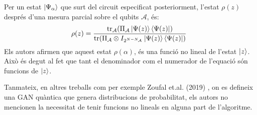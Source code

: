Per un estat $\ket{\Psi_\alpha}$ que surt del circuit especificat posteriorment, l'estat $\rho(z)$ després d'una mesura parcial sobre el qubits $\mathcal{A}$, és:
$$
\rho(z) = \frac{\tr_\mathcal{A}(\Pi_\mathcal{A}\ket{\Psi(z)}\bra{\Psi(z)})}{\tr(\Pi_\mathcal{A} \otimes I_{2^{N-N_\mathcal{A}}}\ket{\Psi(z)}\bra{\Psi(z)})}
$$
Els autors afirmen que aquest estat $\rho(\alpha)$, és una funció no lineal de l'estat $\ket{z}$. Això és degut al fet que tant el denominador com el numerador de l'equació són funcions de $\ket{z}$.

Tanmateix, en altres treballs com per exemple Zoufal et.al. (2019) \cite{QGAN_IBM}, on es defineix una GAN quàntica que genera distribucions de probabilitat, els autors no mencionen la necessitat de tenir funcions no lineals en alguna part de l'algoritme.


